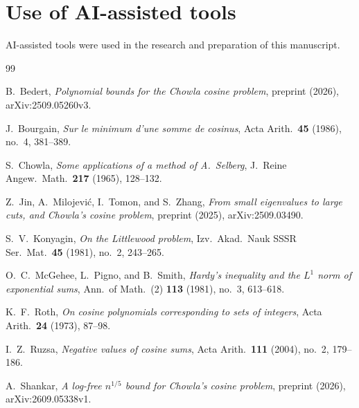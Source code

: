 \documentclass{amsart}
\theoremstyle{remark}
\numberwithin{equation}{section}
\numberwithin{table}{section}
\begin{document}
\section*{Use of AI-assisted tools}
AI-assisted tools were used in the research and preparation of this manuscript.

\begin{thebibliography}{99}

B.~Bedert, \emph{Polynomial bounds for the Chowla cosine problem}, preprint (2026), arXiv:2509.05260v3.

J.~Bourgain, \emph{Sur le minimum d'une somme de cosinus}, Acta Arith.\ \textbf{45} (1986), no.~4, 381--389.

S.~Chowla, \emph{Some applications of a method of A.~Selberg}, J.~Reine Angew.\ Math.\ \textbf{217} (1965), 128--132.

Z.~Jin, A.~Milojevi\'c, I.~Tomon, and S.~Zhang, \emph{From small eigenvalues to large cuts, and Chowla's cosine problem}, preprint (2025), arXiv:2509.03490.

S.~V.~Konyagin, \emph{On the Littlewood problem}, Izv.\ Akad.\ Nauk SSSR Ser.\ Mat.\ \textbf{45} (1981), no.~2, 243--265.

O.~C.~McGehee, L.~Pigno, and B.~Smith, \emph{Hardy's inequality and the $L^1$ norm of exponential sums}, Ann.\ of Math.\ (2) \textbf{113} (1981), no.~3, 613--618.

K.~F.~Roth, \emph{On cosine polynomials corresponding to sets of integers}, Acta Arith.\ \textbf{24} (1973), 87--98.

I.~Z.~Ruzsa, \emph{Negative values of cosine sums}, Acta Arith.\ \textbf{111} (2004), no.~2, 179--186.

A.~Shankar, \emph{A log-free $n^{1/5}$ bound for Chowla's cosine problem}, preprint (2026), arXiv:2609.05338v1.

\end{thebibliography}
\end{document}
